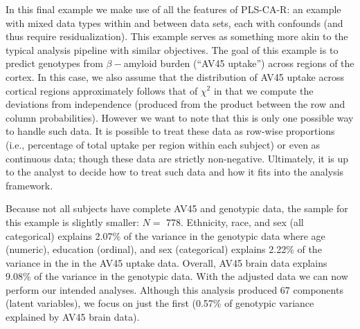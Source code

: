 \documentclass[12pt]{article}
\begin{document}
In this final example we make use of all the features of PLS-CA-R: an
example with mixed data types within and between data sets, each with
confounds (and thus require residualization). This example serves as
something more akin to the typical analysis pipeline with similar
objectives. The goal of this example is to predict genotypes from
\(\beta-\)amyloid burden (``AV45 uptake'') across regions of the cortex.
In this case, we also assume that the distribution of AV45 uptake across
cortical regions approximately follows that of \(\chi^2\) in that we
compute the deviations from independence (produced from the product
between the row and column probabilities). However we want to note that
this is only one possible way to handle such data. It is possible to
treat these data as row-wise proportions (i.e., percentage of total
uptake per region within each subject) or even as continuous data;
though these data are strictly non-negative. Ultimately, it is up to the
analyst to decide how to treat such data and how it fits into the
analysis framework.

Because not all subjects have complete AV45 and genotypic data, the
sample for this example is slightly smaller: \(N=\) 778. Ethnicity,
race, and sex (all categorical) explains 2.07\% of the variance in the
genotypic data where age (numeric), education (ordinal), and sex
(categorical) explains 2.22\% of the variance in the in the AV45 uptake
data. Overall, AV45 brain data explains 9.08\% of the variance in the
genotypic data. With the adjusted data we can now perform our intended
analyses. Although this analysis produced 67 components (latent
variables), we focus on just the first (0.57\% of genotypic variance
explained by AV45 brain data).
\end{document}
